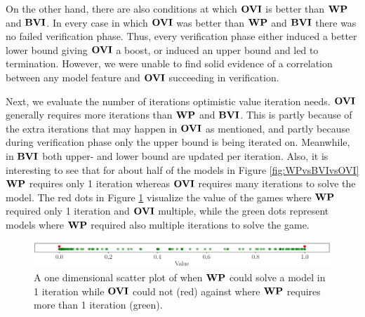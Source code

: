 On the other hand, there are also conditions at which $\OVI$ is better than $\mathbf{WP}$ and $\mathbf{BVI}$.
In every case in which $\OVI$ was better than $\mathbf{WP}$ and $\mathbf{BVI}$ there was no failed verification phase. 
Thus, every verification phase either induced a better lower bound giving $\OVI$ a boost, or induced an upper bound and led to termination.
However, we were unable to find solid evidence of a correlation between any model feature and $\OVI$ succeeding in verification.

Next, we evaluate the number of iterations optimistic value iteration needs. $\OVI$ generally requires more iterations than $\mathbf{WP}$ and $\mathbf{BVI}$. This is partly because of the extra iterations that may happen in $\OVI$ as mentioned, 
and partly because during verification phase only the upper bound is being iterated on. Meanwhile, in $\mathbf{BVI}$ both upper- and lower bound are updated per iteration.
Also, it is interesting to see that for about half of the models in Figure \ref{fig:WPvsBVIvsOVI} $\mathbf{WP}$ requires only 1 iteration whereas $\OVI$ requires many iterations to solve the model.
The red dots in Figure \ref{fig:OVIinstantCompute} visualize the value of the games where $\mathbf{WP}$ required only 1 iteration and $\OVI$ multiple,
while the green dots represent models where $\mathbf{WP}$ required also multiple iterations to solve the game.

\begin{figure}[h!]
    \centering
    \includegraphics[width=1\textwidth]{figures/OVI_Bad_At_Computing_Instant_Values.png}
    \caption[$\OVI$ cannot instantly compute models]{
        A one dimensional scatter plot of when $\mathbf{WP}$ could solve a model in 1 iteration while $\OVI$ could not (red) 
        against where $\mathbf{WP}$ requires more than 1 iteration (green).
    }
    \label{fig:OVIinstantCompute}
\end{figure}
\FloatBarrier


